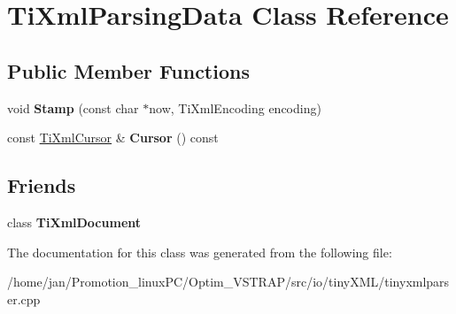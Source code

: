 \hypertarget{classTiXmlParsingData}{}\section{Ti\+Xml\+Parsing\+Data Class Reference}
\label{classTiXmlParsingData}
\subsection*{Public Member Functions}
\begin{DoxyCompactItemize}
\item 
\mbox{\label{classTiXmlParsingData_a65cee8ab77a36c605db08c84b4c30a7d}} 
void {\bfseries Stamp} (const char $\ast$now, Ti\+Xml\+Encoding encoding)
\item 
\mbox{\label{classTiXmlParsingData_a02ba4903fd3b70b43524ad60a4eece7c}} 
const \hyperlink{structTiXmlCursor}{Ti\+Xml\+Cursor} \& {\bfseries Cursor} () const
\end{DoxyCompactItemize}
\subsection*{Friends}
\begin{DoxyCompactItemize}
\item 
\mbox{\label{classTiXmlParsingData_a173617f6dfe902cf484ce5552b950475}} 
class {\bfseries Ti\+Xml\+Document}
\end{DoxyCompactItemize}


The documentation for this class was generated from the following file\+:\begin{DoxyCompactItemize}
\item 
/home/jan/\+Promotion\+\_\+linux\+P\+C/\+Optim\+\_\+\+V\+S\+T\+R\+A\+P/src/io/tiny\+X\+M\+L/tinyxmlparser.\+cpp\end{DoxyCompactItemize}
